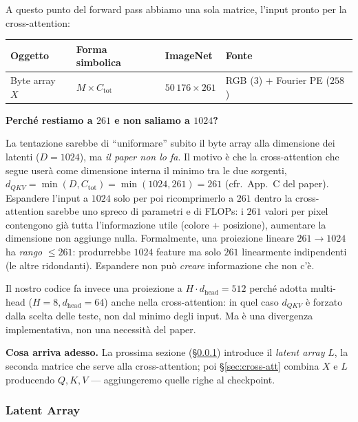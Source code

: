 \documentclass[
  11pt,
]{article}
\begin{document}
\begin{notabox}[title={\textbf{Checkpoint dimensioni --- fine \S1.4.3}}]
A questo punto del forward pass abbiamo una sola matrice, l'input pronto per la cross-attention:

\medskip
\begin{center}
\begin{tabular}{@{}llll@{}}
\toprule
\textbf{Oggetto} & \textbf{Forma simbolica} & \textbf{ImageNet} & \textbf{Fonte} \\
\midrule
Byte array $X$ & $M \times C_{\text{tot}}$ & $50\,176 \times 261$ & RGB ($3$) $+$ Fourier PE ($258$) \\
\bottomrule
\end{tabular}
\end{center}

\medskip
\textbf{Perché restiamo a $261$ e non saliamo a $1024$?}

La tentazione sarebbe di ``uniformare'' subito il byte array alla dimensione dei latenti ($D = 1024$), ma \emph{il paper non lo fa}. Il motivo è che la cross-attention che segue userà come dimensione interna il minimo tra le due sorgenti, $d_{QKV} = \min(D, C_{\text{tot}}) = \min(1024, 261) = 261$ (cfr.\ App.\ C del paper). Espandere l'input a $1024$ solo per poi ricomprimerlo a $261$ dentro la cross-attention sarebbe uno spreco di parametri e di FLOPs: i $261$ valori per pixel contengono già tutta l'informazione utile (colore + posizione), aumentare la dimensione non aggiunge nulla. Formalmente, una proiezione lineare $261 \to 1024$ ha \emph{rango} $\le 261$: produrrebbe $1024$ feature ma solo $261$ linearmente indipendenti (le altre ridondanti). Espandere non può \emph{creare} informazione che non c'è.

Il nostro codice fa invece una proiezione a $H \cdot d_{\text{head}} = 512$ perché adotta multi-head ($H=8, d_{\text{head}}=64$) anche nella cross-attention: in quel caso $d_{QKV}$ è forzato dalla scelta delle teste, non dal minimo degli input. Ma è una divergenza implementativa, non una necessità del paper.

\medskip
\textbf{Cosa arriva adesso.} La prossima sezione (\S\ref{sec:latent-array}) introduce il \emph{latent array} $L$, la seconda matrice che serve alla cross-attention; poi \S\ref{sec:cross-att} combina $X$ e $L$ producendo $Q, K, V$ --- aggiungeremo quelle righe al checkpoint.
\end{notabox}

\subsubsection{Latent Array}
\label{sec:latent-array}
\end{document}

